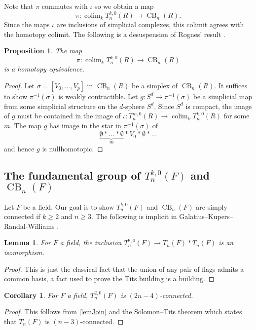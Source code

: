 \documentclass[a4paper]{amsart}
\DeclareMathOperator{\CB}{CB}
\newcommand{\m}{\to}
\numberwithin{theoremcounter}{section}
\newtheorem{lemma}[lemmaauto]{Lemma}
\newtheorem{proposition}[propositionauto]{Proposition}
\newtheorem{corollary}[corollaryauto]{Corollary}
\theoremstyle{definition}
\theoremstyle{remark}
\DeclareMathOperator*{\colim}{colim}
\begin{document}
Note that $\pi$ commutes with $\iota$ so we obtain a map $$ \pi\colon    \colim_k T_n^{k,0}(R) \m {\CB}_n(R).$$ Since the maps $\iota$ are inclusions of simplicial complexes, this colimit agrees with the homotopy colimit. The following is a desuspension of Rognes' result \cite[Lemma 14.6]{Rog1}.

\begin{proposition} \label{colimTD}
The map $$ \pi\colon  \colim_k T_n^{k,0}(R) \m {\CB}_n(R) $$ is a homotopy equivalence.


\end{proposition}

\begin{proof}
Let  $\sigma=[V_0,\dots,V_p]$ in ${\CB}_n(R)$ be a simplex of ${\CB}_n(R)$. It suffices to show $\pi^{-1}(\sigma)$ is weakly contractible. Let $g\colon S^d \m \pi^{-1}(\sigma)$ be a simplicial map from some simplicial structure on the $d$-sphere $S^d$. Since $S^d$ is compact, the image of $g$ must be contained in the image of $\iota\colon  T^{m,0}_n(R) \m \colim_k T_n^{k,0}(R)$ for some $m$. The map $g$ has image in the star in $\pi^{-1}(\sigma)$ of $$\underbrace{\emptyset * \dots * \emptyset}_{m} * V_0 * \emptyset* \dots $$ and hence $g$ is nullhomotopic.
\end{proof}

\subsection{The fundamental group of $T^{k,0}_n(F)$ and ${\CB}_n(F)$}

Let $F$ be a field. Our goal is to show $T^{k,0}_n(F)$ and ${\CB}_n(F)$ are simply connected if $k \geq 2$ and $n \geq 3$. The following is implicit in Galatius--Kupers--Randal-Williams \cite{e2cellsIV}.

\begin{lemma} \label{lemJoin}
For $F$ a field, the inclusion $T^{2,0}_n(F) \m T_n(F) * T_n(F)$ is an isomorphism. 
\end{lemma}

\begin{proof}
This is just the classical fact that the union of any pair of flags admits a common basis, a fact used to prove the Tits building is a building. 
\end{proof}

\begin{corollary}\label{CorT2Conn}
For $F$ a field, $T^{2,0}_n(F)$ is $(2n-4)$-connected.
\end{corollary}
\begin{proof}
This follows from \autoref{lemJoin} and the Solomon--Tits theorem which states that $T_n(F)$ is $(n-3)$-connected.
\end{proof}
\end{document}
